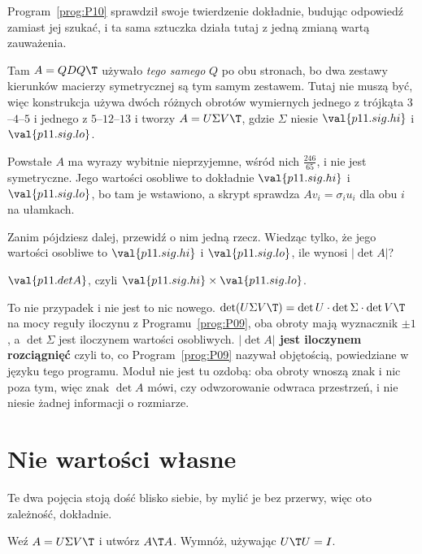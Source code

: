 \begin{fr}
Program~\ref{prog:P10} sprawdził swoje twierdzenie dokładnie, budując
odpowiedź zamiast jej szukać, i ta sama sztuczka działa tutaj z jedną zmianą
wartą zauważenia.

Tam $A = QDQ\T$ używało \emph{tego samego} $Q$ po obu stronach, bo dwa zestawy
kierunków macierzy symetrycznej są tym samym zestawem. Tutaj nie muszą być,
więc konstrukcja używa dwóch różnych obrotów wymiernych \dash{} jednego z
trójkąta $3$--$4$--$5$ i jednego z $5$--$12$--$13$ \dash{} i tworzy
$A = U\Sigma V\T$, gdzie $\Sigma$ niesie $\val{p11.sig.hi}$ i
$\val{p11.sig.lo}$.

Powstałe $A$ ma wyrazy wybitnie nieprzyjemne, wśród nich $\frac{246}{65}$, i nie
jest symetryczne. Jego wartości osobliwe to dokładnie $\val{p11.sig.hi}$ i
$\val{p11.sig.lo}$, bo tam je wstawiono, a skrypt sprawdza
$Av_i = \sigma_i u_i$ dla obu $i$ na ułamkach.

Zanim pójdziesz dalej, przewidź o nim jedną rzecz. Wiedząc tylko, że jego
wartości osobliwe to $\val{p11.sig.hi}$ i $\val{p11.sig.lo}$, ile wynosi
$\lvert\det A\rvert$?
\dotline
\nextframe
\end{fr}

\begin{fr}
\begin{ansblock}
$\val{p11.detA}$, czyli
$\val{p11.sig.hi} \times \val{p11.sig.lo}$.
\end{ansblock}

To nie przypadek i nie jest to nic nowego. $\det(U\Sigma V\T) = \det U \cdot
\det\Sigma \cdot \det V\T$ na mocy reguły iloczynu z Programu~\ref{prog:P09},
oba obroty mają wyznacznik $\pm 1$, a $\det\Sigma$ jest iloczynem wartości
osobliwych. \textbf{$\lvert\det A\rvert$ jest iloczynem rozciągnięć} \dash{}
czyli to, co Program~\ref{prog:P09} nazywał objętością, powiedziane w języku
tego programu. Moduł nie jest tu ozdobą: oba obroty wnoszą znak i nic poza tym,
więc znak $\det A$ mówi, czy odwzorowanie odwraca przestrzeń, i nie niesie
żadnej informacji o rozmiarze.
\end{fr}

\section{Nie wartości własne}
\label{sec:P11-not-eigen}

\begin{fr}
Te dwa pojęcia stoją dość blisko siebie, by mylić je bez przerwy, więc oto
zależność, dokładnie.

Weź $A = U\Sigma V\T$ i utwórz $A\T A$. Wymnóż, używając $U\T U = I$.
\dotline
\nextframe
\end{fr}

